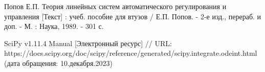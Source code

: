 \begingroup 
\renewcommand{\section}[2]{\anonsection{\uppercase{Библиографический список}}}
\begin{thebibliography}{00}

\bibitem{}
    Попов Е.П.
    Теория линейных систем автоматического регулирования и управления [Текст] : учеб. пособие для втузов / Е.П. Попов. - 2-е изд., перераб. и доп. - М. : Наука, 1989. - 301 с. 

    SciPy v1.11.4 Manual
    [Электронный ресурс] // 
    URL: https://docs.scipy.org/doc/scipy/reference/generated/scipy.integrate.odeint.html
    (дата обращения: 10.декабря.2023)

\end{thebibliography}
\endgroup

\clearpage